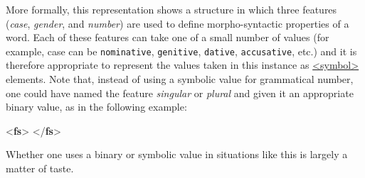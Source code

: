 More formally, this representation shows a structure in which three features (\textit{case}, \textit{gender}, and \textit{number}) are used to define morpho-syntactic properties of a word. Each of these features can take one of a small number of values (for example, case can be \texttt{nominative}, \texttt{genitive}, \texttt{dative}, \texttt{accusative}, etc.) and it is therefore appropriate to represent the values taken in this instance as \hyperref[TEI.symbol]{<symbol>} elements. Note that, instead of using a symbolic value for grammatical number, one could have named the feature \textit{singular} or \textit{plural} and given it an appropriate binary value, as in the following example: \par\bgroup{}\exampleFont \begin{shaded}\noindent\mbox{}{<\textbf{fs}>}\mbox{}\newline 
{}\mbox{}\newline 
\hspace*{1em}\mbox{}\newline 
{}\mbox{}\newline 
{}\mbox{}\newline 
\hspace*{1em}\mbox{}\newline 
{}\mbox{}\newline 
{}\mbox{}\newline 
\hspace*{1em}\mbox{}\newline 
{}\mbox{}\newline 
{</\textbf{fs}>}\end{shaded}\egroup\par \noindent  Whether one uses a binary or symbolic value in situations like this is largely a matter of taste.\par
